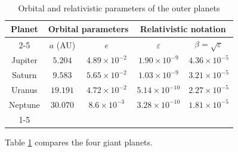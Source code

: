 \documentclass[11pt]{article}
\begin{document}
\begin{table}[h]
    \centering
    \begin{tabular}{|c|c|c|c|c|}
        \hline
        \multirow{2}{*}{Planet} & \multicolumn{2}{|c|}{Orbital parameters} & \multicolumn{2}{|c|}{Relativistic notation} \\
        \cline{2-5}
         & $a$ (AU) & $e$ & $\varepsilon$ & $\beta=\sqrt{\varepsilon}$ \\
         \hline
         Jupiter & $5.204$ & $4.89 \times 10^{-2}$ & $1.90 \times 10^{-9}$ & $4.36 \times 10^{-5}$ \\
         \hline
         Saturn & $9.583$ & $5.65 \times 10^{-2}$ & $1.03 \times 10^{-9}$ & $3.21 \times 10^{-5}$ \\
         \hline
        Uranus & $19.191$ & $4.72 \times 10^{-2}$ & $5.14 \times 10^{-10}$ & $2.27 \times 10^{-5}$ \\
        \hline
        Neptune & $30.070$ & $8.6 \times 10^{-3}$ & $3.28 \times 10^{-10}$ & $1.81 \times 10^{-5}$\\
        \cline{1-5}
    \end{tabular}
    \caption{ Orbital and relativistic parameters of the outer planets}
    \label{tab:one}
\end{table}

Table \ref{tab:one} compares the four giant planets.
\printbibliography
\end{document}
